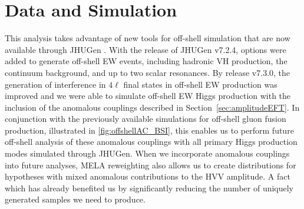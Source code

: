 



\section{Data and Simulation}


This analysis takes advantage of new tools for off-shell simulation that are now available through JHUGen \cite{2010,2012,2014,2016,2020,2021}. With the release of JHUGen v7.2.4, options were added to generate off-shell EW events, including hadronic VH production, the continuum background, and up to two scalar resonances. By release v7.3.0, the generation of interference in $4\ell$ final states in off-shell EW production was improved and we were able to simulate off-shell EW Higgs production with the inclusion of the anomalous couplings described in Section~\ref{sec:amplitudeEFT}. In conjunction with the previously available simulations for off-shell gluon fusion production, illustrated in \ref{fig:offshellAC_BSI}, this enables us to perform future off-shell analysis of these anomalous couplings with all primary Higgs production modes simulated through JHUGen. When we incorporate anomalous couplings into future analyses, MELA reweighting also allows us to create distributions for hypotheses with mixed anomalous contributions to the HVV amplitude. A fact which has already benefited us by significantly reducing the number of uniquely generated samples we need to produce. 

